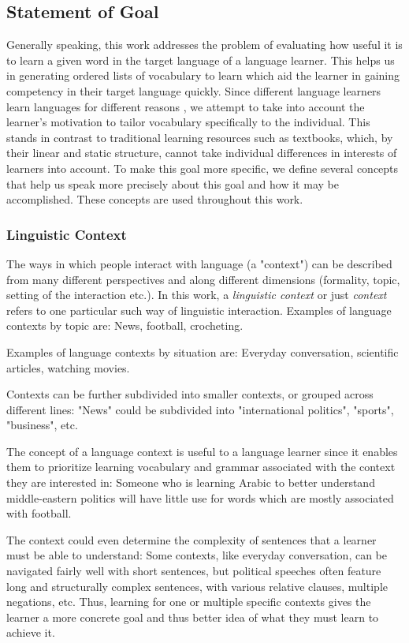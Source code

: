 \subsection{Statement of Goal} \label{sec:statement-of-goal}
Generally speaking, this work addresses the problem of evaluating how useful it is to learn a given word in the target language of a language learner.
This helps us in generating ordered lists of vocabulary to learn which aid the learner in gaining competency in their target language quickly.
Since different language learners learn languages for different reasons , we attempt to take into account the learner's motivation to tailor vocabulary specifically to the individual.
This stands in contrast to traditional learning resources such as textbooks, which, by their linear and static structure, cannot take individual differences in interests of learners into account.
To make this goal more specific, we define several concepts that help us speak more precisely about this goal and how it may be accomplished.
These concepts are used throughout this work.

\subsubsection{Linguistic Context}
The ways in which people interact with language (a "context") can be described from many different perspectives and along different dimensions (formality, topic, setting of the interaction etc.).
In this work, a \textit{linguistic context} or just \textit{context} refers to one particular such way of linguistic interaction.
Examples of language contexts by topic are:
News, football, crocheting.

Examples of language contexts by situation are:
Everyday conversation, scientific articles, watching movies.

Contexts can be further subdivided into smaller contexts, or grouped across different lines:
"News" could be subdivided into "international politics", "sports", "business", etc.

The concept of a language context is useful to a language learner since it enables them to prioritize learning vocabulary and grammar associated with the context they are interested in:
Someone who is learning Arabic to better understand middle-eastern politics will have little use for words which are mostly associated with football.

The context could even determine the complexity of sentences that a learner must be able to understand:
Some contexts, like everyday conversation, can be navigated fairly well with short sentences, but political speeches often feature long and structurally complex sentences, with various relative clauses, multiple negations, etc. 
Thus, learning for one or multiple specific contexts gives the learner a more concrete goal and thus better idea of what they must learn to achieve it.

